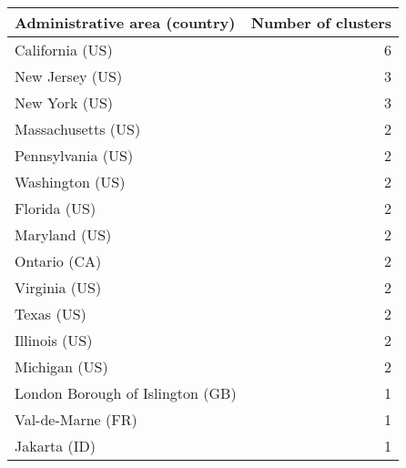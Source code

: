 \begin{tabular}{lr}
\toprule
    Administrative area (country) &  Number of clusters \\
\midrule
                  California (US) &                   6 \\
                  New Jersey (US) &                   3 \\
                    New York (US) &                   3 \\
               Massachusetts (US) &                   2 \\
                Pennsylvania (US) &                   2 \\
                  Washington (US) &                   2 \\
                     Florida (US) &                   2 \\
                    Maryland (US) &                   2 \\
                     Ontario (CA) &                   2 \\
                    Virginia (US) &                   2 \\
                       Texas (US) &                   2 \\
                    Illinois (US) &                   2 \\
                    Michigan (US) &                   2 \\
 London Borough of Islington (GB) &                   1 \\
                Val-de-Marne (FR) &                   1 \\
                     Jakarta (ID) &                   1 \\
\bottomrule
\end{tabular}
